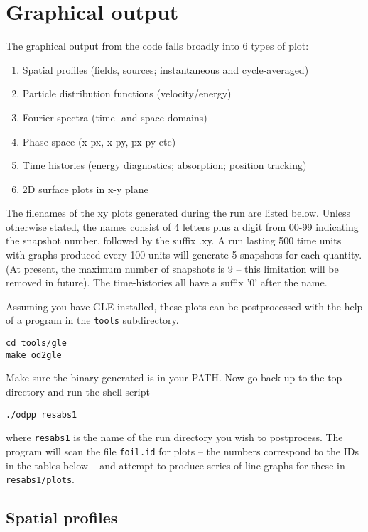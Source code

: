 \documentclass[11pt]{article}
\begin{document}
\section{Graphical output} 

The graphical output from the code falls broadly into 6 types of plot: 
\begin{enumerate}
\item Spatial profiles (fields, sources; instantaneous and cycle-averaged) 
\item Particle distribution functions (velocity/energy) 
\item Fourier spectra (time- and space-domains) 
\item Phase space (x-px, x-py, px-py etc) 
\item Time histories (energy diagnostics; absorption; position tracking) 
\item 2D surface plots in x-y plane 
\end{enumerate}

The filenames of the xy plots generated during the run are listed below. Unless otherwise stated, the names consist of 4 letters plus a digit from 00-99 indicating the snapshot number, followed by the suffix .xy. A run lasting 500 time units with graphs produced every 100 units will generate 5 snapshots for each quantity. (At present, the maximum number of snapshots is 9 -- this limitation will be removed in future). The time-histories all have a suffix '0' after the name. 

Assuming you have GLE installed, these plots can be postprocessed with the help of a program in the \texttt{tools} subdirectory.

\begin{verbatim}
cd tools/gle
make od2gle
\end{verbatim}

Make sure the binary generated is in your PATH.  Now go back up to the top directory and run the shell script
\begin{verbatim}
./odpp resabs1
\end{verbatim}
\noindent where \texttt{resabs1} is the name of the run directory you wish to postprocess. The program will scan the file \texttt{foil.id} for plots -- the numbers correspond to the IDs in the tables below -- and attempt to produce series of line graphs for these in \texttt{resabs1/plots}.


\subsection{Spatial profiles} 
 
\end{document}

